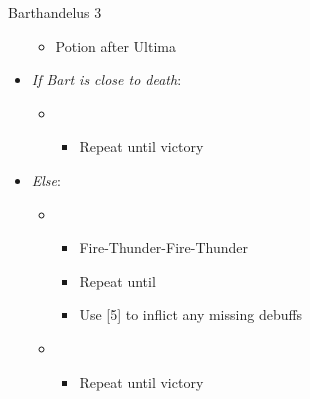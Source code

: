 \begin{battle}[1:26]{Barthandelus 3}
\begin{itemize}
\begin{itemize}
				      \item Potion after Ultima
			      \end{itemize}
			\item \textit{If Bart is close to death}:
			      \begin{itemize}
				      \item \first
				            \begin{itemize}
					            \item Repeat until victory
				            \end{itemize}
			      \end{itemize}
			\item \textit{Else}:
			      \begin{itemize}
				      \item \sixth
				            \begin{itemize}
					            \item Fire-Thunder-Fire-Thunder
					            \item Repeat until \stagger
					            \item Use [5] to inflict any missing debuffs
				            \end{itemize}
				      \item \first
				            \begin{itemize}
					            \item Repeat until victory
				            \end{itemize}
			      \end{itemize}
		\end{itemize}
\end{battle}
